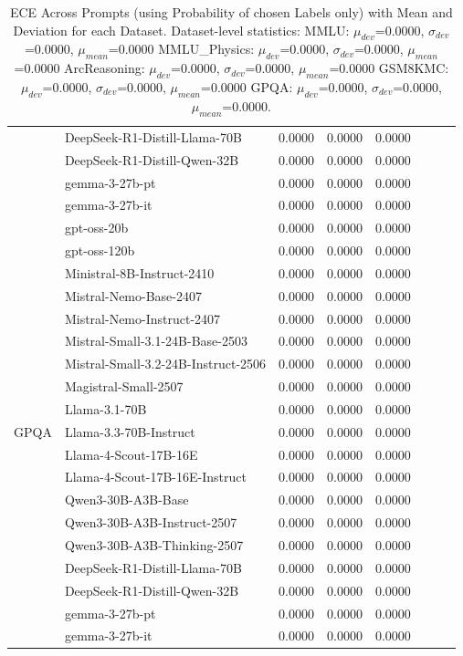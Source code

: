 \begin{table}[h]
{\begin{tabular}{l|lcccc|cc}
        & DeepSeek-R1-Distill-Llama-70B & 0.0000 & 0.0000 & 0.0000 \\
        & DeepSeek-R1-Distill-Qwen-32B & 0.0000 & 0.0000 & 0.0000 \\
        & gemma-3-27b-pt & 0.0000 & 0.0000 & 0.0000 \\
        & gemma-3-27b-it & 0.0000 & 0.0000 & 0.0000 \\
        \midrule
        \multirow{19}{*}{GPQA} & gpt-oss-20b & 0.0000 & 0.0000 & 0.0000 \\
        & gpt-oss-120b & 0.0000 & 0.0000 & 0.0000 \\
        & Ministral-8B-Instruct-2410 & 0.0000 & 0.0000 & 0.0000 \\
        & Mistral-Nemo-Base-2407 & 0.0000 & 0.0000 & 0.0000 \\
        & Mistral-Nemo-Instruct-2407 & 0.0000 & 0.0000 & 0.0000 \\
        & Mistral-Small-3.1-24B-Base-2503 & 0.0000 & 0.0000 & 0.0000 \\
        & Mistral-Small-3.2-24B-Instruct-2506 & 0.0000 & 0.0000 & 0.0000 \\
        & Magistral-Small-2507 & 0.0000 & 0.0000 & 0.0000 \\
        & Llama-3.1-70B & 0.0000 & 0.0000 & 0.0000 \\
        & Llama-3.3-70B-Instruct & 0.0000 & 0.0000 & 0.0000 \\
        & Llama-4-Scout-17B-16E & 0.0000 & 0.0000 & 0.0000 \\
        & Llama-4-Scout-17B-16E-Instruct & 0.0000 & 0.0000 & 0.0000 \\
        & Qwen3-30B-A3B-Base & 0.0000 & 0.0000 & 0.0000 \\
        & Qwen3-30B-A3B-Instruct-2507 & 0.0000 & 0.0000 & 0.0000 \\
        & Qwen3-30B-A3B-Thinking-2507 & 0.0000 & 0.0000 & 0.0000 \\
        & DeepSeek-R1-Distill-Llama-70B & 0.0000 & 0.0000 & 0.0000 \\
        & DeepSeek-R1-Distill-Qwen-32B & 0.0000 & 0.0000 & 0.0000 \\
        & gemma-3-27b-pt & 0.0000 & 0.0000 & 0.0000 \\
        & gemma-3-27b-it & 0.0000 & 0.0000 & 0.0000 \\
        \midrule
        \bottomrule
    \end{tabular}
    }
    \caption{ECE Across Prompts (using Probability of chosen Labels only) with Mean and Deviation for each Dataset. Dataset-level statistics: MMLU: $\mu_{dev}$=0.0000, $\sigma_{dev}$=0.0000, $\mu_{mean}$=0.0000 MMLU_Physics: $\mu_{dev}$=0.0000, $\sigma_{dev}$=0.0000, $\mu_{mean}$=0.0000 ArcReasoning: $\mu_{dev}$=0.0000, $\sigma_{dev}$=0.0000, $\mu_{mean}$=0.0000 GSM8KMC: $\mu_{dev}$=0.0000, $\sigma_{dev}$=0.0000, $\mu_{mean}$=0.0000 GPQA: $\mu_{dev}$=0.0000, $\sigma_{dev}$=0.0000, $\mu_{mean}$=0.0000.}
    \label{tab:ece}
\end{table}
